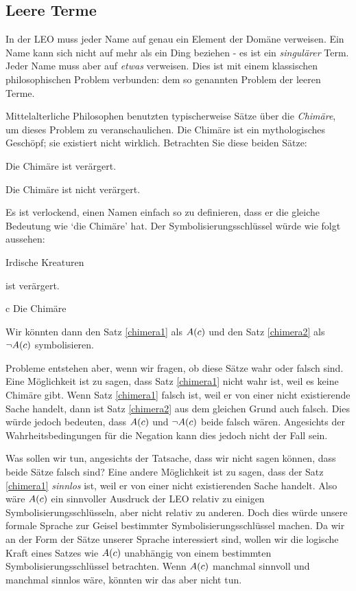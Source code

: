 \subsection{Leere Terme}

In der LEO muss jeder Name auf genau ein Element der Domäne verweisen. Ein Name kann sich nicht auf mehr als ein Ding beziehen - es ist ein \emph{singulärer} Term. Jeder Name muss aber auf \emph{etwas} verweisen. Dies ist mit einem klassischen philosophischen Problem verbunden: dem so genannten Problem der leeren Terme.

Mittelalterliche Philosophen benutzten typischerweise Sätze über die \emph{Chimäre}, um dieses Problem zu veranschaulichen. Die Chimäre ist ein mythologisches Geschöpf; sie existiert nicht wirklich. Betrachten Sie diese beiden Sätze:
\begin{earg}
\item[\ex{chimera1}] Die Chimäre ist verärgert.
\item[\ex{chimera2}] Die Chimäre ist nicht verärgert.
\end{earg}
Es ist verlockend, einen Namen einfach so zu definieren, dass er die gleiche Bedeutung wie `die Chimäre' hat. Der Symbolisierungsschlüssel würde wie folgt aussehen: 
\begin{ekey}
\item[\text{Domäne}] Irdische Kreaturen
\item[\atom{A}{x}]  ist verärgert.
\item[c] Die Chimäre
\end{ekey}
Wir könnten dann den Satz \ref{chimera1} als $\mathord{A}(c)$ und den Satz \ref{chimera2} als $\neg \mathord{A}(c)$ symbolisieren.

Probleme entstehen aber, wenn wir fragen, ob diese Sätze wahr oder falsch sind. Eine Möglichkeit ist zu sagen, dass Satz \ref{chimera1} nicht wahr ist, weil es keine Chimäre gibt. Wenn Satz \ref{chimera1} falsch ist, weil er von einer nicht existierende Sache handelt, dann ist Satz \ref{chimera2} aus dem gleichen Grund auch falsch. Dies würde jedoch bedeuten, dass $\mathord{A}(c)$ und $\neg \mathord{A}(c)$ beide falsch wären. Angesichts der Wahrheitsbedingungen für die Negation kann dies jedoch nicht der Fall sein.

Was sollen wir tun, angesichts der Tatsache, dass wir nicht sagen können, dass beide Sätze falsch sind? Eine andere Möglichkeit ist zu sagen, dass der Satz \ref{chimera1} \emph{sinnlos} ist, weil er von einer nicht existierenden Sache handelt. Also wäre $\mathord{A}(c)$ ein sinnvoller Ausdruck der LEO relativ zu einigen Symbolisierungsschlüsseln, aber nicht relativ zu anderen. Doch dies würde unsere formale Sprache zur Geisel bestimmter Symbolisierungsschlüssel machen. Da wir an der Form der Sätze unserer Sprache interessiert sind, wollen wir die logische Kraft eines Satzes wie $\mathord{A}(c)$ unabhängig von einem bestimmten Symbolisierungsschlüssel betrachten. Wenn $\mathord{A}(c)$ manchmal sinnvoll und manchmal sinnlos wäre, könnten wir das aber nicht tun.

